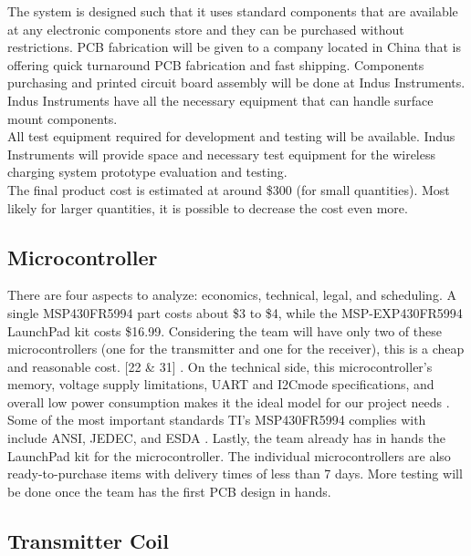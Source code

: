 \documentclass[12pt]{article}
\begin{document}
\indent
The system is designed such that it uses standard components that are available at any electronic components store and they can be purchased without restrictions. PCB fabrication will be given to a company located in China that is offering quick turnaround PCB fabrication and fast shipping. Components purchasing and printed circuit board assembly will be done at Indus Instruments. Indus Instruments have all the necessary equipment that can handle surface mount components.\\

\indent
All test equipment required for development and testing will be available. Indus Instruments will provide space and necessary test equipment for the wireless charging system prototype evaluation and testing.\\

\indent
The final product cost is estimated at around \$300 (for small quantities). Most likely for larger quantities, it is possible to decrease the cost even more. 

\subsection{Microcontroller}

\indent \indent
There are four aspects to analyze: economics, technical, legal, and scheduling. A single MSP430FR5994 part costs about \$3 to \$4, while the MSP-EXP430FR5994 LaunchPad kit costs \$16.99. Considering the team will have only two of these microcontrollers (one for the transmitter and one for the receiver), this is a cheap and reasonable cost. [22 \& 31] \cite{MSP430FR599x}  \cite{testKit}. On the technical side, this microcontroller’s memory, voltage supply limitations, UART and I2Cmode specifications, and overall low power consumption makes it the ideal model for our project needs \cite{MSP430FR599x}. Some of the most important standards TI’s MSP430FR5994 complies with include ANSI, JEDEC, and ESDA \cite{MSP430FR599x}. Lastly, the team already has in hands the LaunchPad kit for the microcontroller. The individual microcontrollers are also ready-to-purchase items with delivery times of less than 7 days. More testing will be done once the team has the first PCB design in hands. 

\subsection{Transmitter Coil}

\end{document}
